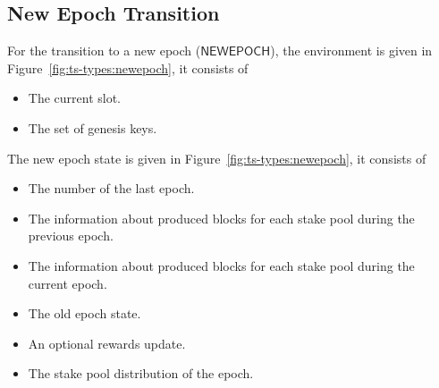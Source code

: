 \subsection{New Epoch Transition}
\label{sec:new-epoch-trans}

For the transition to a new epoch ($\mathsf{NEWEPOCH}$), the environment is
given in Figure~\ref{fig:ts-types:newepoch}, it consists of

\begin{itemize}
\item The current slot.
\item The set of genesis keys.
\end{itemize}
The new epoch state is given in Figure~\ref{fig:ts-types:newepoch}, it consists
of

\begin{itemize}
\item The number of the last epoch.
\item The information about produced blocks for each stake pool during the previous epoch.
\item The information about produced blocks for each stake pool during the current epoch.
\item The old epoch state.
\item An optional rewards update.
\item The stake pool distribution of the epoch.
\end{itemize}

